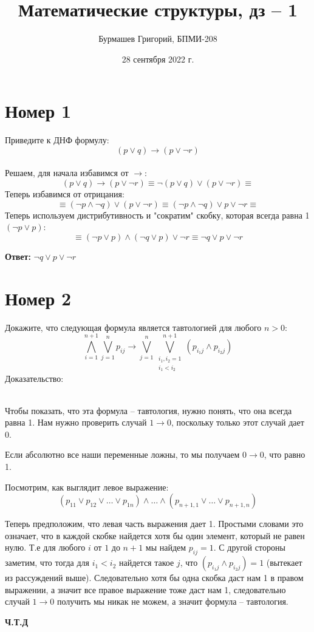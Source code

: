 \documentclass[a4paper,12pt]{article}
\author{Бурмашев Григорий, БПМИ-208}
\title{Математические структуры, дз -- 1}
\date{28 сентября 2022 г.}
\begin{document}
\maketitle
\section*{Номер 1}
Приведите к ДНФ формулу:
\[
(p \vee q ) \to (p \vee \neg r)
\]
\\
Решаем, для начала избавимся от $\to$:
\[
(p \vee q ) \to (p \vee \neg r) \equiv \neg (p \vee q) \vee (p \vee \neg r) \equiv
\]
Теперь избавимся от отрицания:
\[
\equiv 
(\neg p \wedge \neg q) \vee (p \vee \neg r) 
\equiv
(\neg p \wedge \neg q) \vee p \vee \neg r
\equiv 
\]
Теперь используем дистрибутивность и "сократим" скобку, которая всегда равна 1 $(\neg p \vee p)$:
\[
\equiv
(\neg p \vee p) \wedge (\neg q \vee p) \vee \neg r
\equiv
\neg q  \vee p \vee \neg r
\]
\begin{center}
\textbf{Ответ: } $ \neg q  \vee p \vee \neg r $
\end{center}
\clearpage
\section*{Номер 2}
Докажите, что следующая формула является тавтологией для любого $ n > 0 $:
\[
\bigwedge\limits_{i=1}^{n+1} \bigvee\limits_{j=1}^{n} p_{ij} \to \bigvee\limits_{j=1}^{n}\bigvee\limits_{\begin{matrix}i_1, i_2 = 1 \\ i_1 < i_2 \end{matrix}}^{n+1} (p_{i_1j} \wedge p_{i_2j})
\]
Доказательство:
\\\

Чтобы показать, что эта формула -- тавтология, нужно понять, что она всегда равна 1. Нам нужно проверить случай $1 \to 0$,  поскольку только этот случай дает 0.  

Если абсолютно все наши переменные ложны, то мы получаем $0 \rightarrow 0 $, что равно 1.

Посмотрим, как выглядит левое выражение:
\[
(p_{11} \vee p_{12} \vee \ldots \vee p_{1n}) \wedge \ldots \wedge (p_{n + 1, 1} \vee \ldots \vee p_{n + 1, n})
\]

Теперь предположим, что левая часть выражения дает 1. Простыми словами это означает, что в каждой скобке найдется хотя бы один элемент, который не равен нулю. Т.е для любого $i$  от $1$ до $n + 1$ мы найдем $p_{ij} = 1$. С другой стороны заметим, что тогда для $i_1 < i_2$ найдется такое $j$, что $(p_{i_1 j} \wedge p_{i_2 j }) = 1$ (вытекает из рассуждений выше). Следовательно хотя бы одна скобка даст нам 1 в правом выражении, а значит все правое выражение тоже даст нам 1, следовательно случай $ 1 \to 0 $ получить мы никак не можем, а значит формула -- тавтология.

\begin{center}
\textbf{Ч.Т.Д} 
\end{center}
\end{document}
